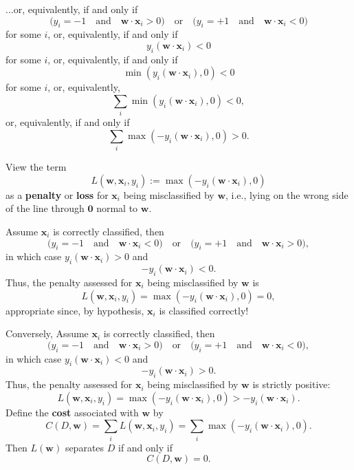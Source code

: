\documentclass{beamer}
\renewcommand{\vw}{\boldsymbol{w}}
\renewcommand{\vx}{\boldsymbol{x}}
\newcommand{\vzero}{\boldsymbol{0}}
\begin{document}
\begin{frame}{}
    
    ...or, equivalently, if and only if
    \[
        \Big(y_i = -1\quad\text{and}\quad \vw\cdot\vx_i >0\Big)
        \quad\text{or}\quad
        \Big(y_i = +1\quad\text{and}\quad \vw\cdot\vx_i <0\Big)
    \]
    for some $i$, or, equivalently, if and only if
    \[
        y_i (\vw\cdot\vx_i) <0
    \]
    for some $i$, or, equivalently, if and only if
    \[
        \min(y_i (\vw\cdot\vx_i), 0) < 0
    \]
    for some $i$, or, equivalently,
    \[
        \sum_i\min(y_i (\vw\cdot\vx_i), 0) < 0,
    \]
    or, equivalently, if and only if
    \[
        \sum_i\max(-y_i (\vw\cdot\vx_i), 0) > 0.
    \]
\end{frame}

\begin{frame}
    View the term
    \[
        L(\vw, \vx_i, y_i) :=\max(-y_i(\vw\cdot\vx_i), 0)
    \]
    as a \textbf{penalty} or \textbf{loss} for $\vx_i$ being misclassified by $\vw$,
    i.e., lying on the wrong side of the line through $\vzero$ normal to $\vw$.

    Assume $\vx_i$ is correctly classified, then
    \[
        \Big(y_i = -1\quad\text{and}\quad \vw\cdot\vx_i <0\Big)
        \quad\text{or}\quad
        \Big(y_i = +1\quad\text{and}\quad \vw\cdot\vx_i >0\Big),
    \]
    in which case $y_i(\vw\cdot\vx_i)>0$ and 
    \[
         -y_i(\vw\cdot\vx_i) < 0.
    \]
    Thus, the penalty assessed for $\vx_i$ being misclassified by $\vw$
    is
    \[
        L(\vw, \vx_i, y_i) = \max(-y_i(\vw\cdot\vx_i), 0) = 0,
    \]
    appropriate since, by hypothesis, $\vx_i$ is classified correctly!
\end{frame}

\begin{frame}{}
    Conversely, Assume $\vx_i$ is correctly classified, then
    \[
        \Big(y_i = -1\quad\text{and}\quad \vw\cdot\vx_i >0\Big)
        \quad\text{or}\quad
        \Big(y_i = +1\quad\text{and}\quad \vw\cdot\vx_i <0\Big),
    \]
    in which case $y_i(\vw\cdot\vx_i)<0$ and 
    \[
         -y_i(\vw\cdot\vx_i) > 0.
    \]
    Thus, the penalty assessed for $\vx_i$ being misclassified by $\vw$
    is strictly positive:
    \[
        L(\vw, \vx_i, y_i) = \max(-y_i(\vw\cdot\vx_i), 0) > -y_i(\vw\cdot\vx_i).
    \]
    Define the \textbf{cost} associated with $\vw$ by
    \[
        C(D, \vw) = \sum_i L(\vw, \vx_i, y_i)
        = \sum_i \max(-y_i(\vw\cdot\vx_i), 0).
    \]
    Then $L(\vw)$ separates $D$ if and only if \[C(D, \vw)=0.\]
\end{frame}
\end{document}
